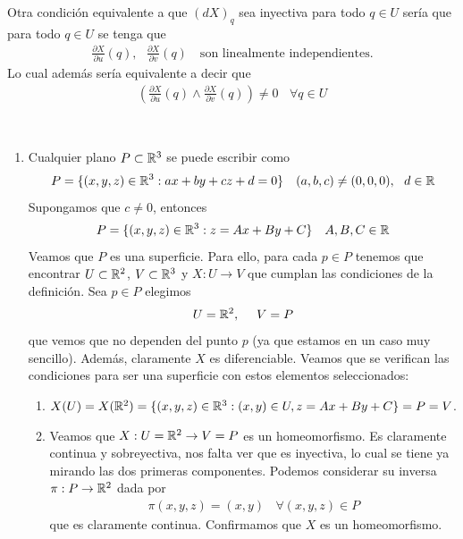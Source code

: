 \begin{observacion}
    Otra condición equivalente a que $(dX)_q$ sea inyectiva para todo $q\in U$ sería que para todo $q\in U$ se tenga que
    \begin{gather*}
        \frac{\partial X}{\partial u}(q),\ \ \ \frac{\partial X}{\partial v}(q)\ \ \ \text{ son linealmente independientes}.
    \end{gather*}
    Lo cual además sería equivalente a decir que 
    \begin{gather*}
        \left(\frac{\partial X}{\partial u}(q) \wedge \frac{\partial X}{\partial v}(q)\right) \neq 0\ \ \ \ \forall q\in U
    \end{gather*}
\end{observacion}

\begin{ejemplo}\
    \begin{enumerate}
        \item Cualquier plano $P\subset \mathbb{R}^3$ se puede escribir como
        \begin{gather*}
            P = \{(x,y,z)\in \mathbb{R}^3 : ax+by+cz+d=0\}\ \ \ (a,b,c)\neq (0,0,0),\ \ d\in \mathbb{R}
        \end{gather*}
        Supongamos que $c\neq 0$, entonces 
        \begin{gather*}
            P=\{(x,y,z)\in \mathbb{R}^3 : z=Ax+By+C\}\ \ \ A,B,C \in \mathbb{R}
        \end{gather*}
        Veamos que $P$ es una superficie. Para ello, para cada $p\in P$ tenemos que encontrar $U\subset \mathbb{R}^2$, $V\subset \mathbb{R}^3$ y $X:U\to V$ que cumplan las condiciones de la definición. Sea $p\in P$ elegimos
        \begin{gather*}
            U=\mathbb{R}^2, \ \ \ \ V=P
        \end{gather*}
        que vemos que no dependen del punto $p$ (ya que estamos en un caso muy sencillo). Además, claramente $X$ es diferenciable. Veamos que se verifican las condiciones para ser una superficie con estos elementos seleccionados:
        \begin{enumerate}
            \item $X(U)=X(\mathbb{R}^2) = \{(x,y,z)\in \mathbb{R}^3 : (x,y)\in U, z=Ax+By+C\} = P = V$.
            
            \item Veamos que $X: U=\mathbb{R}^2 \to V=P$ es un homeomorfismo. Es claramente continua y sobreyectiva, nos falta ver que es inyectiva, lo cual se tiene ya mirando las dos primeras componentes. Podemos considerar su inversa $\pi: P \to \mathbb{R}^2$ dada por 
            \begin{gather*}
                \pi(x,y,z) = (x,y) \ \ \ \ \forall (x,y,z)\in P
            \end{gather*}
            que es claramente continua. Confirmamos que $X$ es un homeomorfismo.


\end{enumerate}
\end{enumerate}
\end{ejemplo}
